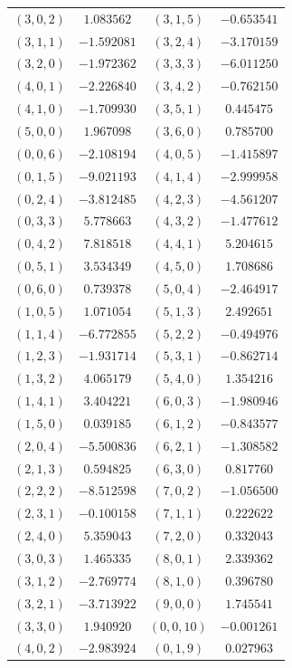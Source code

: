 \begin{table}
\begin{tabular}{cc@{\qquad}cc}
$(3,0,2)$ & $1.083562$ & $(3,1,5)$ & $-0.653541$ \\
$(3,1,1)$ & $-1.592081$ & $(3,2,4)$ & $-3.170159$ \\
$(3,2,0)$ & $-1.972362$ & $(3,3,3)$ & $-6.011250$ \\
$(4,0,1)$ & $-2.226840$ & $(3,4,2)$ & $-0.762150$ \\
$(4,1,0)$ & $-1.709930$ & $(3,5,1)$ & $0.445475$ \\
$(5,0,0)$ & $1.967098$ & $(3,6,0)$ & $0.785700$ \\
$(0,0,6)$ & $-2.108194$ & $(4,0,5)$ & $-1.415897$ \\
$(0,1,5)$ & $-9.021193$ & $(4,1,4)$ & $-2.999958$ \\
$(0,2,4)$ & $-3.812485$ & $(4,2,3)$ & $-4.561207$ \\
$(0,3,3)$ & $5.778663$ & $(4,3,2)$ & $-1.477612$ \\
$(0,4,2)$ & $7.818518$ & $(4,4,1)$ & $5.204615$ \\
$(0,5,1)$ & $3.534349$ & $(4,5,0)$ & $1.708686$ \\
$(0,6,0)$ & $0.739378$ & $(5,0,4)$ & $-2.464917$ \\
$(1,0,5)$ & $1.071054$ & $(5,1,3)$ & $2.492651$ \\
$(1,1,4)$ & $-6.772855$ & $(5,2,2)$ & $-0.494976$ \\
$(1,2,3)$ & $-1.931714$ & $(5,3,1)$ & $-0.862714$ \\
$(1,3,2)$ & $4.065179$ & $(5,4,0)$ & $1.354216$ \\
$(1,4,1)$ & $3.404221$ & $(6,0,3)$ & $-1.980946$ \\
$(1,5,0)$ & $0.039185$ & $(6,1,2)$ & $-0.843577$ \\
$(2,0,4)$ & $-5.500836$ & $(6,2,1)$ & $-1.308582$ \\
$(2,1,3)$ & $0.594825$ & $(6,3,0)$ & $0.817760$ \\
$(2,2,2)$ & $-8.512598$ & $(7,0,2)$ & $-1.056500$ \\
$(2,3,1)$ & $-0.100158$ & $(7,1,1)$ & $0.222622$ \\
$(2,4,0)$ & $5.359043$ & $(7,2,0)$ & $0.332043$ \\
$(3,0,3)$ & $1.465335$ & $(8,0,1)$ & $2.339362$ \\
$(3,1,2)$ & $-2.769774$ & $(8,1,0)$ & $0.396780$ \\
$(3,2,1)$ & $-3.713922$ & $(9,0,0)$ & $1.745541$ \\
$(3,3,0)$ & $1.940920$ & $(0,0,10)$ & $-0.001261$ \\
$(4,0,2)$ & $-2.983924$ & $(0,1,9)$ & $0.027963$ \\

\end{tabular}
\end{table}
